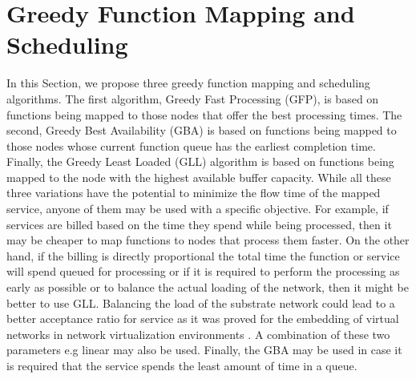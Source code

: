 \documentclass[conference]{IEEEtran}
\begin{document}
\section{Greedy Function Mapping and Scheduling}\label{greedyalg}
In this Section, we propose three greedy function mapping and scheduling algorithms. The first algorithm, Greedy Fast Processing (GFP), is based on functions being mapped to those nodes that offer the best processing times. The second, Greedy Best Availability (GBA) is based on functions being mapped to those nodes whose current function queue has the earliest completion time. Finally, the Greedy Least Loaded (GLL) algorithm is based on functions being mapped to the node with the highest available buffer capacity. While all these three variations have the potential to minimize the flow time of the mapped service, anyone of them may be used with a specific objective. For example, if services are billed based on the time they spend while being processed, then it may be cheaper to map functions to nodes that process them faster. On the other hand, if the billing is directly proportional the total time the function or service will spend queued for processing or if it is required to perform the processing as early as possible or to balance the  actual loading of the network, then it might be better to use GLL. Balancing the load of the substrate network could lead to a better acceptance ratio for service as it was proved for the embedding of virtual networks in network virtualization environments \cite{Chowdhury12, path}. A combination of these two parameters e.g linear may also be used. Finally, the GBA may be used in case it is required that the service spends the least amount of time in a queue.\\
\end{document}
